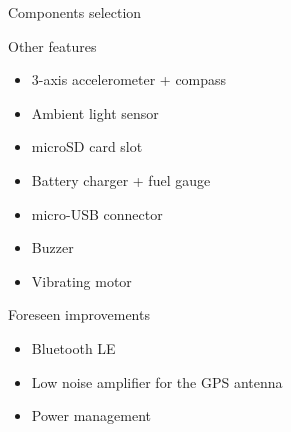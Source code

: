 \documentclass[compress,red]{beamer}
\begin{document}
\begin{frame}{Components selection}

  Other features
  \begin{itemize}
  \item 3-axis accelerometer + compass
  \item Ambient light sensor
  \item microSD card slot
  \item Battery charger + fuel gauge
  \item micro-USB connector
  \item Buzzer
  \item Vibrating motor
  \end{itemize}

  \vskip 5mm
  Foreseen improvements
  \begin{itemize}
  \item Bluetooth LE
  \item Low noise amplifier for the GPS antenna
  \item Power management
  \end{itemize}

  \begin{center}
  \end{center}


\end{frame}
\end{document}
